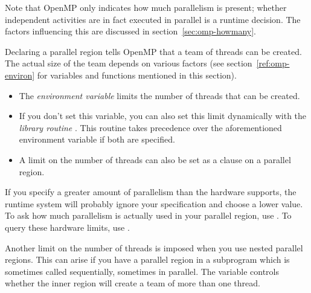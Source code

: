 Note that OpenMP only indicates how much parallelism is present;
whether independent activities are in fact executed in parallel
is a runtime decision. The factors influencing this are discussed
in section~\ref{sec:omp-howmany}.

Declaring a parallel region tells OpenMP that a team of threads can be created.
The actual size of the team depends on various factors (see section~\ref{ref:omp-environ}
for variables and functions mentioned in this section).
\begin{itemize}
\item The \emph{environment variable}
   limits the number of
  threads that can be created.
\item If you don't set this variable, you can also set this limit
  dynamically with the \emph{library routine} . This routine takes
  precedence over the aforementioned environment variable if both are
  specified.
\item A limit on the number of threads can also be set as a clause
  on a parallel region.
\end{itemize}
If you specify a greater amount of parallelism than the hardware supports,
the runtime system will probably ignore your specification and choose a lower value.
To ask how much parallelism is actually used in your parallel region,
use . To query these hardware limits,
use .

Another limit on the number of threads is imposed when you use nested parallel regions.
This can arise if you have a parallel region in a subprogram which is sometimes called
sequentially, sometimes in parallel. The variable  controls
whether the inner region will create a team of more than one thread.

